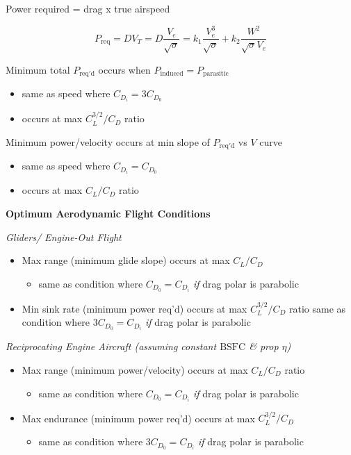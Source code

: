 \documentclass[
]{book}
\providecommand{\tightlist}{%
  \setlength{\itemsep}{0pt}\setlength{\parskip}{0pt}}
\begin{document}
Power required = drag x true airspeed

\[P_{\mathrm{req}} = DV_T = D\frac{V_e}{\sqrt{\sigma}} = k_1\frac{V_e^3}{\sqrt{\sigma}} + k_2\frac{W^2}{\sqrt{\sigma}V_e} \]

Minimum total \(P_{\mathrm{req'd}}\) occurs when \(P_{\mathrm{induced}} = P_{\mathrm{parasitic}}\)

\begin{itemize}
\tightlist
\item
  same as speed where \(C_{D_i} = 3C_{D_0}\)
\item
  occurs at max \(C_L^{3/2}/C_D\) ratio
\end{itemize}

Minimum power/velocity occurs at min slope of \(P_{\mathrm{req'd}}\) vs \(V\) curve

\begin{itemize}
\tightlist
\item
  same as speed where \(C_{D_i} = C_{D_0}\)
\item
  occurs at max \(C_L /C_D\) ratio
\end{itemize}

\textbf{Optimum Aerodynamic Flight Conditions}

\emph{Gliders/ Engine-Out Flight}

\begin{itemize}
\tightlist
\item
  Max range (minimum glide slope) occurs at max \(C_L/C_D\)

  \begin{itemize}
  \tightlist
  \item
    same as condition where \(C_{D_0} = C_{D_i}\) \emph{if} drag polar is parabolic
  \end{itemize}
\item
  Min sink rate (minimum power req'd) occurs at max \(C_L^{3/2} /C_D\) ratio same as condition where \(3C_{D_0} = C_{D_i}\) \emph{if} drag polar is parabolic
\end{itemize}

\emph{Reciprocating Engine Aircraft (assuming constant \(\mathrm{BSFC}\) \& prop \(\eta\))}

\begin{itemize}
\tightlist
\item
  Max range (minimum power/velocity) occurs at max \(C_L/C_D\) ratio

  \begin{itemize}
  \tightlist
  \item
    same as condition where \(C_{D_0} = C_{D_i}\) \emph{if} drag polar is parabolic
  \end{itemize}
\item
  Max endurance (minimum power req'd) occurs at max \(C_L^{3/2} / C_D\)

  \begin{itemize}
  \tightlist
  \item
    same as condition where \(3C_{D_0} = C_{D_i}\) \emph{if} drag polar is parabolic
  \end{itemize}
\end{itemize}
\end{document}
